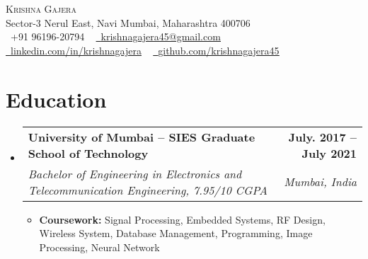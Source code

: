 \documentclass[letterpaper,11pt]{article}
\makeatletter
\newcommand{\resumeItem}[1]{
  \item\small{
    {#1 \vspace{-2pt}}
  }
}
\newcommand{\resumeSubheading}[4]{
  \vspace{-2pt}\item
    \begin{tabular*}{1.0\textwidth}[t]{l@{\extracolsep{\fill}}r}
      \textbf{#1} & \textbf{\small #2} \\
      \textit{\small#3} & \textit{\small #4} \\
    \end{tabular*}\vspace{-7pt}
}
\newcommand{\resumeSubHeadingListStart}{\begin{itemize}[leftmargin=0.0in, label={}]}
\newcommand{\resumeSubHeadingListEnd}{\end{itemize}}
\newcommand{\resumeItemListStart}{\begin{itemize}}
\newcommand{\resumeItemListEnd}{\end{itemize}\vspace{-5pt}}
\makeatother
\begin{document}

\begin{center}
    {\Huge \scshape Krishna Gajera} \\ \vspace{1pt}
    Sector-3 Nerul East, Navi Mumbai, Maharashtra 400706 \\ \vspace{1pt}
    \small \raisebox{-0.1\height}\faPhone\ +91 96196-20794 ~ \href{mailto:krishnagajera45@gmail.com}{\raisebox{-0.2\height}\faEnvelope\ \underline{krishnagajera45@gmail.com}} ~ 
    \href{https://linkedin.com/in/krishnagajera/}{\raisebox{-0.2\height}\faLinkedin\ \underline{linkedin.com/in/krishnagajera}} ~
    \href{https://github.com/krishnagajera45}{\raisebox{-0.2\height}\faGithub\ \underline{github.com/krishnagajera45}}
\end{center}

\section{Education}
  \resumeSubHeadingListStart
    \resumeSubheading
      {University of Mumbai -- SIES Graduate School of Technology}{July. 2017 -- July 2021}
      {Bachelor of Engineering in Electronics and Telecommunication Engineering, 7.95/10 CGPA}{Mumbai, India}
        \resumeItemListStart
            \resumeItem{\textbf{Coursework:} Signal Processing, Embedded Systems, RF Design, Wireless System, Database Management, Programming, Image Processing, Neural Network}
        \resumeItemListEnd
  \resumeSubHeadingListEnd
\end{document}
